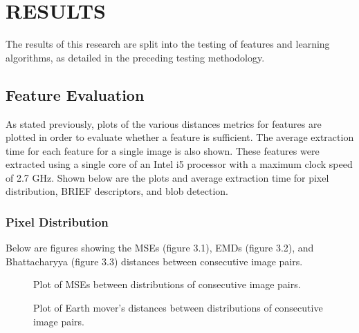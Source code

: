 %
%
%



\chapter{RESULTS}

The results of this research are split into the testing of features and learning algorithms, as detailed in the preceding testing methodology.

\section{Feature Evaluation}
As stated previously, plots of the various distances metrics for features are plotted in order to evaluate whether a feature is sufficient.
The average extraction time for each feature for a single image is also shown.
These features were extracted using a single core of an Intel i5 processor with a maximum clock speed of 2.7 GHz.
Shown below are the plots and average extraction time for pixel distribution, BRIEF descriptors, and blob detection.

\subsection{Pixel Distribution}
Below are figures showing the MSEs (figure 3.1), EMDs (figure 3.2), and Bhattacharyya (figure 3.3) distances between consecutive image pairs.



\begin{figure}[htb]
\centering
\scalebox{1.0}{}
\caption{Plot of MSEs between distributions of consecutive image pairs.}
\label{fig:tamu-fig3}
\end{figure}

\begin{figure}[htb]
\centering
\scalebox{1.0}{}
\caption{Plot of Earth mover's distances between distributions of consecutive image pairs.}
\label{fig:tamu-fig3}
\end{figure}

